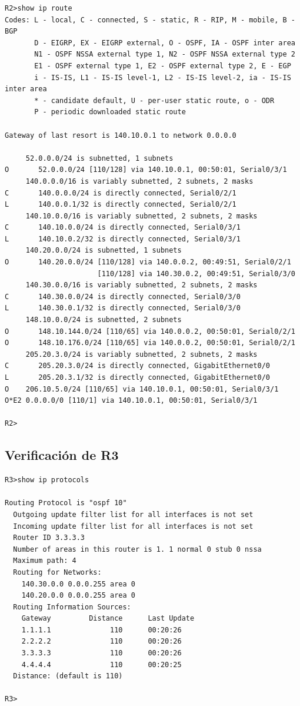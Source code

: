 \documentclass[12pt,a4paper]{article}
\begin{document}
\begin{verbatim}
R2>show ip route
Codes: L - local, C - connected, S - static, R - RIP, M - mobile, B - BGP
       D - EIGRP, EX - EIGRP external, O - OSPF, IA - OSPF inter area
       N1 - OSPF NSSA external type 1, N2 - OSPF NSSA external type 2
       E1 - OSPF external type 1, E2 - OSPF external type 2, E - EGP
       i - IS-IS, L1 - IS-IS level-1, L2 - IS-IS level-2, ia - IS-IS inter area
       * - candidate default, U - per-user static route, o - ODR
       P - periodic downloaded static route

Gateway of last resort is 140.10.0.1 to network 0.0.0.0

     52.0.0.0/24 is subnetted, 1 subnets
O       52.0.0.0/24 [110/128] via 140.10.0.1, 00:50:01, Serial0/3/1
     140.0.0.0/16 is variably subnetted, 2 subnets, 2 masks
C       140.0.0.0/24 is directly connected, Serial0/2/1
L       140.0.0.1/32 is directly connected, Serial0/2/1
     140.10.0.0/16 is variably subnetted, 2 subnets, 2 masks
C       140.10.0.0/24 is directly connected, Serial0/3/1
L       140.10.0.2/32 is directly connected, Serial0/3/1
     140.20.0.0/24 is subnetted, 1 subnets
O       140.20.0.0/24 [110/128] via 140.0.0.2, 00:49:51, Serial0/2/1
                      [110/128] via 140.30.0.2, 00:49:51, Serial0/3/0
     140.30.0.0/16 is variably subnetted, 2 subnets, 2 masks
C       140.30.0.0/24 is directly connected, Serial0/3/0
L       140.30.0.1/32 is directly connected, Serial0/3/0
     148.10.0.0/24 is subnetted, 2 subnets
O       148.10.144.0/24 [110/65] via 140.0.0.2, 00:50:01, Serial0/2/1
O       148.10.176.0/24 [110/65] via 140.0.0.2, 00:50:01, Serial0/2/1
     205.20.3.0/24 is variably subnetted, 2 subnets, 2 masks
C       205.20.3.0/24 is directly connected, GigabitEthernet0/0
L       205.20.3.1/32 is directly connected, GigabitEthernet0/0
O    206.10.5.0/24 [110/65] via 140.10.0.1, 00:50:01, Serial0/3/1
O*E2 0.0.0.0/0 [110/1] via 140.10.0.1, 00:50:01, Serial0/3/1

R2>
\end{verbatim}

\subsection{Verificación de R3}

\begin{verbatim}
R3>show ip protocols

Routing Protocol is "ospf 10"
  Outgoing update filter list for all interfaces is not set 
  Incoming update filter list for all interfaces is not set 
  Router ID 3.3.3.3
  Number of areas in this router is 1. 1 normal 0 stub 0 nssa
  Maximum path: 4
  Routing for Networks:
    140.30.0.0 0.0.0.255 area 0
    140.20.0.0 0.0.0.255 area 0
  Routing Information Sources:  
    Gateway         Distance      Last Update 
    1.1.1.1              110      00:20:26
    2.2.2.2              110      00:20:26
    3.3.3.3              110      00:20:26
    4.4.4.4              110      00:20:25
  Distance: (default is 110)

R3>
\end{verbatim}
\end{document}
